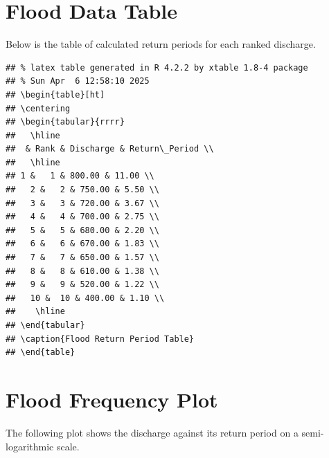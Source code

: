 \documentclass{tufte-handout}\usepackage[]{graphicx}\usepackage[]{xcolor}
\makeatletter
\newenvironment{kframe}{%
 \def\at@end@of@kframe{}%
 \ifinner\ifhmode%
  \def\at@end@of@kframe{\end{minipage}}%
  \begin{minipage}{\columnwidth}%
 \fi\fi%
 \def\FrameCommand##1{\hskip\@totalleftmargin \hskip-\fboxsep
 \colorbox{shadecolor}{##1}\hskip-\fboxsep
     \hskip-\linewidth \hskip-\@totalleftmargin \hskip\columnwidth}%
 \MakeFramed {\advance\hsize-\width
   \@totalleftmargin\z@ \linewidth\hsize
   \@setminipage}}%
 {\par\unskip\endMakeFramed%
 \at@end@of@kframe}
\newenvironment{knitrout}{}{} %
\makeatother
\begin{document}
\section{Flood Data Table}

Below is the table of calculated return periods for each ranked discharge.

\begin{knitrout}
\color{fgcolor}\begin{kframe}
\begin{verbatim}
## % latex table generated in R 4.2.2 by xtable 1.8-4 package
## % Sun Apr  6 12:58:10 2025
## \begin{table}[ht]
## \centering
## \begin{tabular}{rrrr}
##   \hline
##  & Rank & Discharge & Return\_Period \\ 
##   \hline
## 1 &   1 & 800.00 & 11.00 \\ 
##   2 &   2 & 750.00 & 5.50 \\ 
##   3 &   3 & 720.00 & 3.67 \\ 
##   4 &   4 & 700.00 & 2.75 \\ 
##   5 &   5 & 680.00 & 2.20 \\ 
##   6 &   6 & 670.00 & 1.83 \\ 
##   7 &   7 & 650.00 & 1.57 \\ 
##   8 &   8 & 610.00 & 1.38 \\ 
##   9 &   9 & 520.00 & 1.22 \\ 
##   10 &  10 & 400.00 & 1.10 \\ 
##    \hline
## \end{tabular}
## \caption{Flood Return Period Table} 
## \end{table}
\end{verbatim}
\end{kframe}
\end{knitrout}

\section*{Flood Frequency Plot}

The following plot shows the discharge against its return period on a semi-logarithmic scale.
\end{document}
